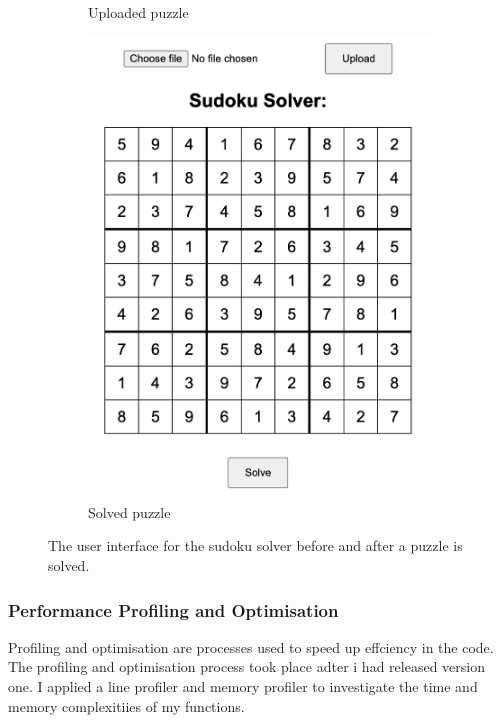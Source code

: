 \documentclass{report}
\begin{document}
\begin{figure}[htbp]
\begin{subfigure}[b]{0.45\textwidth}
        \caption{Uploaded puzzle}
        \label{fig:figure3}
    \end{subfigure}
    \hfill
    \begin{subfigure}[b]{0.45\textwidth}
        \centering
        \includegraphics[width=\textwidth]{Images/appSolved.png}
        \caption{Solved puzzle}
        \label{fig:figure4}
    \end{subfigure}
    \caption{ The user interface for the sudoku solver before and after a puzzle is solved.}
    \label{fig:both_figures2}
\end{figure}

\subsubsection*{Performance Profiling and Optimisation}
Profiling and optimisation are processes used to speed up effciency in the code. The profiling and optimisation process took place adter i had released version one.
I applied a line profiler and memory profiler to investigate the time and memory complexitiies of my functions.
\end{document}
